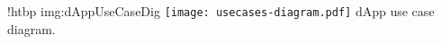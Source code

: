 \namedfigure
{!htbp}
{img:dAppUseCaseDig}
{\texttt{[image: usecases-diagram.pdf]}}
{dApp use case diagram.}
